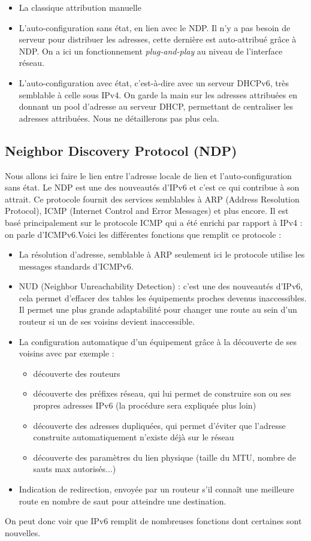 \documentclass[a4paper,11pt,final]{article}
\begin{document}
\begin{itemize}
\item La classique attribution manuelle\item L’auto-configuration sans état, en lien avec le NDP. Il n’y a pas besoin de serveur pour distribuer les adresses, cette dernière est auto-attribué grâce à NDP. On a ici un fonctionnement \emph{plug-and-play} au niveau de l’interface réseau.\item L’auto-configuration avec état, c’est-à-dire avec un serveur DHCPv6, très semblable à celle sous IPv4. On garde la main sur les adresses attribuées en donnant un pool d’adresse au serveur DHCP, permettant de centraliser les adresses attribuées. Nous ne détaillerons pas plus cela.
\end{itemize}

\subsection{Neighbor Discovery Protocol (NDP)}

Nous allons ici faire le lien entre l’adresse locale de lien et l’auto-configuration sans état.
Le NDP est une des nouveautés d’IPv6 et c’est ce qui contribue à son attrait. Ce protocole fournit des services semblables à ARP (Address Resolution Protocol), ICMP (Internet Control and Error Messages) et plus encore. Il est basé principalement sur le protocole ICMP qui a été enrichi par rapport à IPv4 : on parle d’ICMPv6.Voici les différentes fonctions que remplit ce protocole :
\begin{itemize}
\item La résolution d’adresse, semblable à ARP seulement ici le protocole utilise les messages standards d’ICMPv6.\item NUD (Neighbor Unreachability Detection) : c’est une des nouveautés d’IPv6, cela permet d’effacer des tables les équipements proches devenus inaccessibles. Il permet une plus grande adaptabilité pour changer une route au sein d’un routeur si un de ses voisins devient inaccessible.\item La configuration automatique d’un équipement grâce à la découverte de ses voisins avec par exemple :
\begin{itemize}
\item découverte des routeurs\item découverte des préfixes réseau, qui lui permet de construire son ou ses propres adresses IPv6 (la procédure sera expliquée plus loin)
\item découverte des adresses dupliquées, qui permet d’éviter que l’adresse construite automatiquement n’existe déjà sur le réseau\item découverte des paramètres du lien physique (taille du MTU, nombre de sauts max autorisés...)
\end{itemize}
\item	Indication de redirection, envoyée par un routeur s’il connaît une meilleure route en nombre de saut pour atteindre une destination.
\end{itemize}On peut donc voir que IPv6 remplit de nombreuses fonctions dont certaines sont nouvelles.
\end{document}
